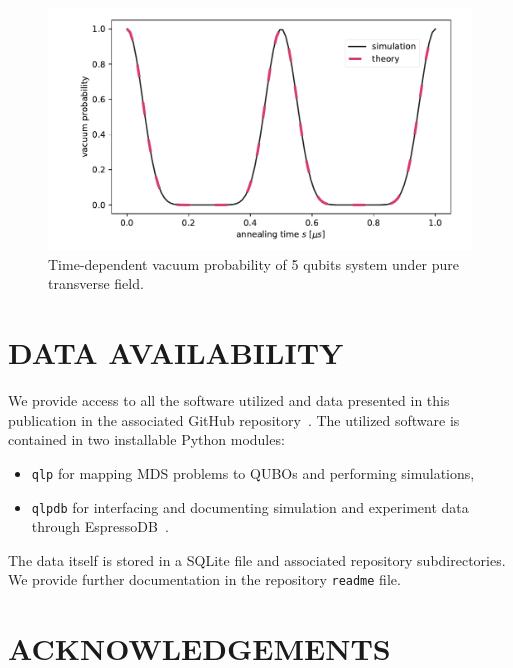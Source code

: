 \documentclass[prd,twocolumn,tightenlines,preprintnumbers,showpacs,superscriptaddress,notitlepage,nofootinbib,eqsecnum,floatfix,longbibliography,aps,10pt]{revtex4-1}
\begin{document}
\begin{figure}
	\centering
	\includegraphics[width=\columnwidth]{./vacuum_probability.pdf}
	\caption{Time-dependent vacuum probability of 5 qubits system under pure transverse field.}
	\label{figcheck}
\end{figure}


\section{DATA AVAILABILITY}
\label{sec:open-source}
We provide access to all the software utilized and data presented in this publication in the associated GitHub repository~\cite{github:cchang5/quantum_linear_programming}.
The utilized software is contained in two installable Python modules:
\begin{itemize}[leftmargin=*]
    \itemsep0em
    \item[] \texttt{qlp} for mapping MDS problems to QUBOs and performing simulations,
    \item[] \texttt{qlpdb} for interfacing and documenting simulation and experiment data through EspressoDB~\cite{Chang:2019khk}.
\end{itemize}
The data itself is stored in a SQLite file and associated repository subdirectories.
We provide further documentation in the repository \texttt{readme} file.


\section{ACKNOWLEDGEMENTS}
\end{document}

